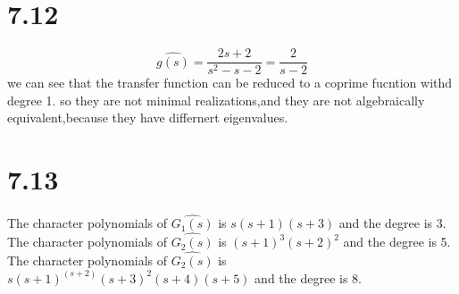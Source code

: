 \documentclass{article}
\begin{document}
\section*{7.12}

\[
\hat{g(s)}=\frac{2s+2}{s^2-s-2}=\frac{2}{s-2}    
\]
we can see that the transfer function can be reduced to a coprime fucntion withd degree 1.
so they are not minimal realizations,and they are not algebraically equivalent,because they have differnert eigenvalues.

\section*{7.13}
The character polynomials of $\hat{G_1(s)}$ is $s(s+1)(s+3)$ and the degree is 3.\\
The character polynomials of $\hat{G_2(s)}$ is $(s+1)^3(s+2)^2$ and the degree is 5.\\
The character polynomials of $\hat{G_2(s)}$ is $s(s+1)^(s+2)(s+3)^2(s+4)(s+5)$ and the degree is 8.\\
\end{document}
